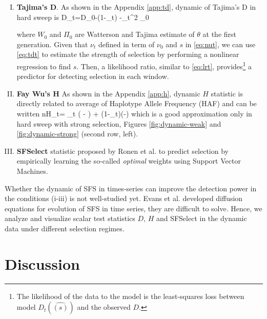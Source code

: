 \documentclass[11pt]{article}
\begin{document}
\begin{enumerate}[I.]
	\item {\bf Tajima's D}. As shown in the Appendix \ref{app:td}, dynamic of 
	Tajima's D in hard sweep is
	\beq
	D_t=D_0-\log(1-\nu_t)  -\nu_t^2 \Pi_0\label{eq:tdt}
	\eeq
	
	where $W_0$ and $\Pi_0$ are Watterson and Tajima estimate 
	of $\theta$ at 
	the first generation.
	Given that $\nu_t$ defined in term of $\nu_0$ and $s$ in 
	\eqref{eq:nut}, we 
	can use \eqref{eq:tdt} to estimate the strength of 
	selection by performing a nonlinear 
	regression to find 
	$s$. Then, a likelihood ratio, similar to \eqref{eq:lrt}, 
	provides\footnote{The 
		likelihood of the data to the model is the least-squares 
		loss between model 
		$D_t(\hat{(s)})$ and the observed $D$.} a predictor for 
	detecting selection in each window. 
	
	
	
	\item {\bf Fay Wu's H} As shown in the Appendix \ref{app:h}, dynamic $H$ 
	statistic is directly related to average of Haplotype Allele Frequency 
	(HAF) \cite{ronen2015predicting} and 
	can be written
	\beq
	nH_t= \theta \nu_t \left( - \right) +
	\theta (1-\nu_t)\left(-\right) 
	\label{eq:ht}
	\eeq
	which is a good approximation only in hard sweep with strong selection, 
	Figures 
	\ref{fig:dynamic-weak} and \ref{fig:dynamic-strong} (second
	row, left). 
	

	
	\item {\bf SFSelect} statistic proposed by Ronen et 
	al. \cite{ronen2013learning} to predict selection by empirically learning 
	the so-called \emph{optimal} weights using Support Vector Machines. 
\end{enumerate}

Whether the dynamic of SFS in times-series can improve the detection power in 
the conditions (i-iii) is not well-studied yet. Evans et al. 
\cite{evans2007non} developed diffusion equations for 
evolution of SFS in time series, they are difficult to solve. 
Hence, we analyze and visualize scalar test statistics $D$, $H$ and SFSelect 
in the dynamic data under different selection regimes.


\section{Discussion}
\end{document}
